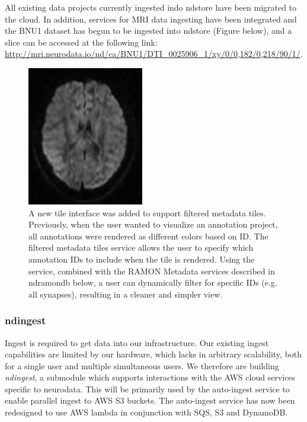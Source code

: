 \documentclass[simplex.tex]{subfiles}
\begin{document}
All existing data projects currently ingested indo ndstore have been migrated to the cloud. In addition, services for MRI data ingesting have been integrated and the BNU1 dataset has begun to be ingested into ndstore (Figure below), and a slice can be accessed at the following link: 
\href{http://mri.neurodata.io/nd/ca/BNU1/DTI_0025906_1/xy/0/0,182/0,218/90/1/}{http://mri.neurodata.io/nd/ca/BNU1/DTI\_0025906\_1/xy/0/0,182/0,218/90/1/}.  

\begin{figure}[h!]
\begin{cframed}
\centering
\includegraphics[width=2in]{./figs/ndstore.png}
\caption{
A new tile interface was added to support filtered metadata tiles. Previously, when the user wanted to visualize an annotation project, all annotations were rendered as different colors based on ID. The filtered metadata tiles service allows the user to specify which annotation IDs to include when the tile is rendered. Using the service, combined with the RAMON Metadata services described in ndramondb below, a user can dynamically filter for specific IDs (e.g. all synapses), resulting in a cleaner and simpler view. 
}
\label{fig:ndstore}
\end{cframed}
\end{figure}


\subsubsection{ndingest}

Ingest is required to get data into our infrastructure.  Our existing ingest capabilities are limited by our hardware, which lacks in arbitrary scalability, both for a single user and multiple simultaneous users.  We therefore are building \textit{ndingest}, a submodule which supports interactions with the AWS cloud services specific to neurodata. This will be primarily used by the auto-ingest service to enable parallel ingest to AWS S3 buckets. The auto-ingest service has now been redesigned to use AWS lambda in conjunction with SQS, S3 and DynamoDB. 
\end{document}
